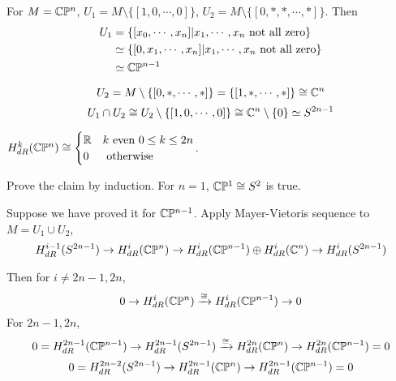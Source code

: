 


\begin{example}
    For  $ M=\mathbb C\mathbb P^n  $,  $ U_1=M\setminus\{[1,0,\cdots,0]\} $,  $ U_2=M\setminus\{[0,*,*,\cdots,*]\} $. Then 
    \begin{equation*}
        \begin{aligned}
            U_1&=\{[x_0,\cdots,x_n]|x_1,\cdots,x_n \text{ not all zero}\}\\&\simeq\{[0,x_1,\cdots,x_n]|x_1,\cdots,x_n \text{ not all zero}\}\\&\simeq \mathbb C\mathbb P^{n-1}
        \end{aligned}
    \end{equation*}

    \begin{equation*}
        U_2=M\setminus\{[0,*,\cdots,*]\}=\{[1,*,\cdots,*]\}\cong \mathbb C^n
    \end{equation*}
    \begin{equation*}
        U_1\cap U_2\cong U_2\setminus\{[1,0,\cdots,0]\}\cong \mathbb C^n\setminus\{0\}\simeq S^{2n-1}
    \end{equation*}

    \begin{claim}
        $ H^k_{dR}(\mathbb C\mathbb P^n)\cong \begin{cases}
            \mathbb R&k \text{ even }0 \leq k \leq 2n\\
            0&\text{ otherwise}
        \end{cases}$.
    \end{claim}
    Prove the claim by induction. For  $ n=1 $,  $ \mathbb C\mathbb P^1\cong S^2 $ is true.
    
    Suppose we have proved it for  $ \mathbb C\mathbb P^{n-1} $. Apply Mayer-Vietoris sequence to  $ M=U_1\cup U_2 $, 
    \begin{equation}
        H_{dR}^{i-1}(S^{2n-1})\rightarrow H_{dR}^{i}(\mathbb C\mathbb P^n)\rightarrow H_{dR}^i(\mathbb C\mathbb P^{n-1})\oplus H_{dR}^i(\mathbb C^n)\rightarrow H_{dR}^i(S^{2n-1})
    \end{equation}

    Then for  $ i\neq 2n-1,2n $,
    \begin{equation}
        0\rightarrow H^i_{dR}(\mathbb C\mathbb P^n)\xrightarrow{\cong}H^i_{dR}(\mathbb C\mathbb P^{n-1})\rightarrow 0
    \end{equation} 
    For  $ 2n-1,2n $,
    \begin{equation}
        0=H^{2n-1}_{dR}(\mathbb C\mathbb P^{n-1})\rightarrow H_{dR}^{2n-1}(S^{2n-1})\xrightarrow{ \cong} H_{dR}^{2n}(\mathbb C\mathbb P^n)\rightarrow H_{dR}^{2n}(\mathbb C\mathbb P^{n-1})=0
    \end{equation} 
    \begin{equation*}
        0=H_{dR}^{2n-2}(S^{2n-1})\rightarrow H_{dR}^{2n-1}(\mathbb C\mathbb P^n)\rightarrow H_{dR}^{2n-1}(\mathbb C\mathbb P^{n-1})=0
    \end{equation*}
\end{example}
